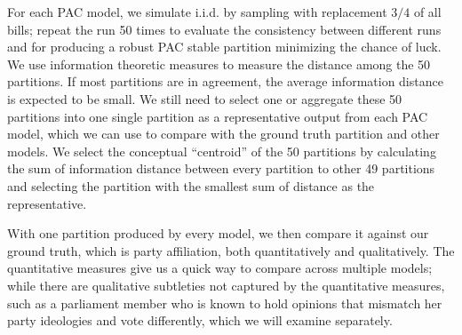 For each PAC model, we simulate i.i.d. by sampling with replacement $3/4$ of
all bills; repeat the run 50 times to evaluate the consistency between
different runs and for producing a robust PAC stable partition minimizing the
chance of luck.
We use information theoretic measures to measure the distance among the 50
partitions.
If most partitions are in agreement, the average information distance is
expected to be small.
We still need to select one or aggregate these 50 partitions into one single
partition as a representative output from each PAC model, which we can use
to compare with the ground truth partition and other models.
We select the conceptual ``centroid'' of the 50 partitions by calculating
the sum of information distance between every partition to other 49 partitions
and selecting the partition with the smallest sum of distance as the
representative.

With one partition produced by every model, we then compare it against our
ground truth, which is party affiliation, both quantitatively and qualitatively.
The quantitative measures give us a quick way to compare across multiple models;
while there are qualitative subtleties not captured by the quantitative
measures, such as a parliament member who is known to hold opinions that
mismatch her party ideologies and vote differently, which we will examine
separately.



